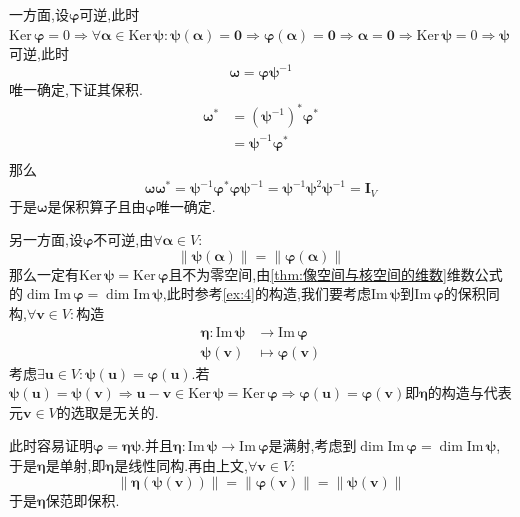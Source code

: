 \begin{formal}
\begin{Proof}
        一方面,设$\bm{\varphi}$可逆,此时$\mathrm{Ker}\,\bm{\varphi}=0\Longrightarrow\forall\bm{\alpha}\in\mathrm{Ker}\,\bm{\psi}:\bm{\psi}\left(\bm{\alpha}\right)=\bm{0}\Longrightarrow\bm{\varphi}\left(\bm{\alpha}\right)=\bm{0}\Longrightarrow\bm{\alpha}=\bm{0}\Longrightarrow\mathrm{Ker}\,\bm{\psi}=0\Longrightarrow\bm{\psi}$可逆,此时\[
        \bm{\omega}=\bm{\varphi\psi}^{-1}
        \]唯一确定,下证其保积.\begin{align*}
            \bm{\omega}^*&=\left(\bm{\psi}^{-1}\right)^*\bm{\varphi}^*\\
            &=\bm{\psi}^{-1}\bm{\varphi}^*\\
        \end{align*}那么\[
        \bm{\omega\omega}^*=\bm{\psi}^{-1}\bm{\varphi}^*\bm{\varphi}\bm{\psi}^{-1}=\bm{\psi}^{-1}\bm{\psi}^2\bm{\psi}^{-1}=\bm{I}_V
        \]于是$\bm{\omega}$是保积算子且由$\bm{\varphi}$唯一确定.

        另一方面,设$\bm{\varphi}$不可逆,由$\forall\bm{\alpha}\in V:$\[
        \left\lVert\bm{\psi}\left(
            \bm{\alpha}
        \right)\right\rVert=\left\lVert\bm{\varphi}\left(
            \bm{\alpha}
        \right)\right\rVert
        \]那么一定有$\mathrm{Ker}\,\bm{\psi}=\mathrm{Ker}\,\bm{\varphi}$且不为零空间,由\cref{thm:像空间与核空间的维数}维数公式的$\dim \mathrm{Im}\,\bm{\varphi}=\dim \mathrm{Im}\,\bm{\psi}$,此时参考\cref{ex:4}的构造,我们要考虑$\mathrm{Im}\,\bm{\psi}$到$\mathrm{Im}\,\bm{\varphi}$的保积同构,$\forall\bm{v}\in V:$构造\begin{align*}
            \bm{\eta}:\mathrm{Im}\,\bm{\psi}&\longrightarrow\mathrm{Im}\,\bm{\varphi}\\
            \bm{\psi}\left(\bm{v}\right)&\longmapsto\bm{\varphi}\left(\bm{v}\right)
        \end{align*}考虑$\exists\bm{u}\in V:\bm{\psi}\left(\bm{u}\right)=\bm{\varphi}\left(\bm{u}\right)$.若$\bm{\psi}\left(\bm{u}\right)=\bm{\psi}\left(\bm{v}\right)\Longrightarrow\bm{u}-\bm{v}\in\mathrm{Ker}\,\bm{\psi}=\mathrm{Ker}\,\bm{\varphi}\Longrightarrow\bm{\varphi}\left(\bm{u}\right)=\bm{\varphi}\left(\bm{v}\right)$即$\bm{\eta}$的构造与代表元$\bm{v}\in V$的选取是无关的.

        此时容易证明$\bm{\varphi}=\bm{\eta\psi}$.并且$\bm{\eta}:\mathrm{Im}\,\bm{\psi}\longrightarrow\mathrm{Im}\,\bm{\varphi}$是满射,考虑到$\dim \mathrm{Im}\,\bm{\varphi}=\dim \mathrm{Im}\,\bm{\psi}$,于是$\bm{\eta}$是单射,即$\bm{\eta}$是线性同构.再由上文,$\forall\bm{v}\in V:$\[
        \left\lVert\bm{\eta}\left(
            \bm{\psi}\left(
                \bm{v}
            \right)
        \right)\right\rVert=\left\lVert\bm{\varphi}\left(
            \bm{v}
        \right)\right\rVert=\left\lVert\bm{\psi}\left(
            \bm{v}
        \right)\right\rVert
        \]于是$\bm{\eta}$保范即保积.


\end{Proof}
\end{formal}
